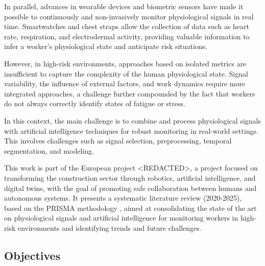 \documentclass[runningheads]{llncs}
\begin{document}
In parallel, advances in wearable devices and biometric sensors have made it possible to continuously and non-invasively monitor physiological signals in real time. Smartwatches and chest straps allow the collection of data such as heart rate, respiration, and electrodermal activity, providing valuable information to infer a worker's physiological state and anticipate risk situations.

However, in high-risk environments, approaches based on isolated metrics are insufficient to capture the complexity of the human physiological state. Signal variability, the influence of external factors, and work dynamics require more integrated approaches, a challenge further compounded by the fact that workers do not always correctly identify states of fatigue or stress.

In this context, the main challenge is to combine and process physiological signals with artificial intelligence techniques for robust monitoring in real-world settings. This involves challenges such as signal selection, preprocessing, temporal segmentation, and modeling.

This work is part of the European project <REDACTED>, a project focused on transforming the construction sector through robotics, artificial intelligence, and digital twins, with the goal of promoting safe collaboration between humans and autonomous systems. It presents a systematic literature review (2020-2025), based on the PRISMA methodology \cite{page2021prisma}, aimed at consolidating the state of the art on physiological signals and artificial intelligence for monitoring workers in high-risk environments and identifying trends and future challenges.
\subsection{Objectives}
\end{document}
